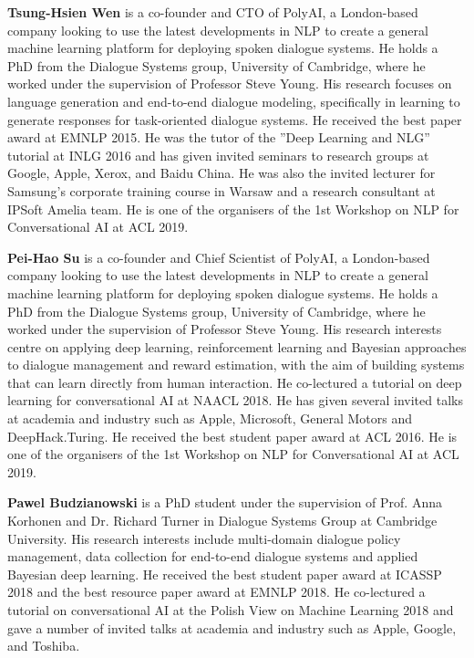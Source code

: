 \begin{bio}
\textbf{Tsung-Hsien Wen} is a co-founder and CTO of PolyAI, a London-based company looking to use the latest developments in NLP to create a general machine learning platform for deploying spoken dialogue systems. He holds a PhD from the Dialogue Systems group, University of Cambridge, where he worked under the supervision of Professor Steve Young. His research focuses on language generation and end-to-end dialogue modeling, specifically in learning to generate responses for task-oriented dialogue systems. He received the best paper award at EMNLP 2015. He was the tutor of the ”Deep Learning and NLG” tutorial at INLG 2016 and has given invited seminars to research groups at Google, Apple, Xerox, and Baidu China. He was also the invited lecturer for Samsung’s corporate training course in Warsaw and a research consultant at IPSoft Amelia team. He is one of the organisers of the 1st Workshop on NLP for Conversational AI at ACL 2019.


\textbf{Pei-Hao Su} is a co-founder and Chief Scientist of PolyAI, a London-based company looking to use the latest developments in NLP to create a general machine learning platform for deploying spoken dialogue systems. He holds a PhD from the Dialogue Systems group, University of Cambridge, where he worked under the supervision of Professor Steve Young. His research interests centre on applying deep learning, reinforcement learning and Bayesian approaches to dialogue management and reward estimation, with the aim of building systems that can learn directly from human interaction. He co-lectured a tutorial on deep learning for conversational AI at NAACL 2018. He has given several invited talks at academia and industry such as Apple, Microsoft, General Motors and DeepHack.Turing. He received the best student paper award at ACL 2016. He is one of the organisers of the 1st Workshop on NLP for Conversational AI at ACL 2019.


\textbf{Pawel Budzianowski} is a PhD student under the supervision of Prof. Anna Korhonen and Dr. Richard Turner in Dialogue Systems Group at Cambridge University. His research interests include multi-domain dialogue policy management, data collection for end-to-end dialogue systems and applied Bayesian deep learning. He received the best student paper award at ICASSP 2018 and the best resource paper award at EMNLP 2018. He co-lectured a tutorial on conversational AI at the Polish View on Machine Learning 2018 and gave a number of invited talks at academia and industry such as Apple, Google, and Toshiba.



\end{bio}
